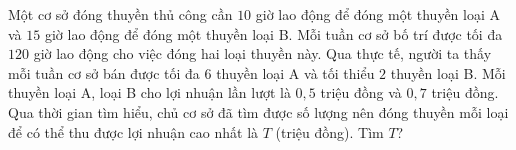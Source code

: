 \begin{ex}
Một cơ sở đóng thuyền thủ công cần $10$ giờ lao động để đóng một thuyền loại A và $15$ giờ lao động để đóng một thuyền loại B. Mỗi tuần cơ sở bố trí được tối đa $120$ giờ lao động cho việc đóng hai loại thuyền này. Qua thực tế, người ta thấy mỗi tuần cơ sở bán được tối đa $6$ thuyền loại A và tối thiểu $2$ thuyền loại B. Mỗi thuyền loại A, loại B cho lợi nhuận lần lượt là $0{,}5$ triệu đồng và $0{,}7$ triệu đồng. Qua thời gian tìm hiểu, chủ cơ sở đã tìm được số lượng nên đóng thuyền mỗi loại để có thể thu được lợi nhuận cao nhất là $T$ (triệu đồng). Tìm $T$?
\end{ex}

